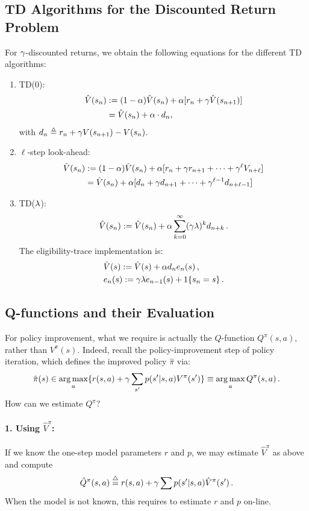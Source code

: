 \subsection{TD Algorithms for the Discounted Return Problem}

For $\gamma$-discounted returns, we obtain the following equations for the
different TD algorithms:
\begin{enumerate}
  \item TD(0):
\begin{align*}
\hat V(s_n) & := (1-\alpha) \hat V(s_n) + \alpha [ r_n +
\gamma\hat V (s_{n+1})] \\
& = \hat V (s_n) + \alpha \cdot d_n,
\end{align*}
with $d_n \triangleq r_n + \gamma V (s_{n+1}) - V(s_n)$.

  \item $\ell$-step look-ahead:
\begin{align*}
\hat V(s_n) & := (1-\alpha) \hat V(s_n) + \alpha [r_n + \gamma r_{n+1}
+ \cdots + \gamma^\ell V_{n+\ell}] \\
& = \hat V(s_n) + \alpha [d_n + \gamma d_{n+1} + \cdots +
\gamma^{\ell-1} d_{n+\ell-1}]
\end{align*}
  \item TD($\lambda$):
$$
\hat V(s_n) := \hat V (s_n) + \alpha \sum_{k=0}^\infty (\gamma \lambda )^k
d_{n+k}\,.
$$
The eligibility-trace implementation is:
\begin{align*}
& \hat V(s) := \hat V(s) + \alpha d_n e_n (s) \,, \\
& e_n(s) := \gamma\lambda e_{n-1}(s) +1\{s_n=s\} \,.
\end{align*}
\end{enumerate}

\subsection{Q-functions and their Evaluation}\label{ss:Q_eval}

For policy improvement, what we require is actually the
$Q$-function $Q^{\pi}(s,a)$, rather than $V^{\pi}(s)$.
Indeed, recall the policy-improvement step of policy iteration, which defines
the improved policy $\hat\pi$ via:
$$
\hat \pi(s) \in \argmax_a \{r(s,a) + \ga \sum_{s'} p(s'|s,a) V^{\pi} (s') \}
 \equiv \argmax_a Q^{\pi}(s,a)\,.
$$
How can we estimate $Q^{\pi}$?

\paragraph{1. Using $\hat V^{\pi}$:}
If we know the one-step model parameters $r$ and $p$,
we may estimate $\hat V^{\pi}$ as above and compute
$$
\hat Q^{\pi} (s,a) \stackrel{\bigtriangleup}{=} r(s,a) +\gamma \sum p(s'|s,a) \hat V^{\pi}(s')\,.
$$
When the model is not known, this requires to estimate $r$ and $p$ on-line.

